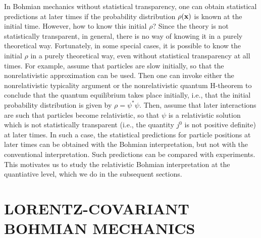 \documentclass[11pt]{article}
\begin{document}
In Bohmian mechanics without statistical transparency, 
one can obtain statistical predictions at later times if 
the probability distribution $\rho({\bf x})$ is known at the initial 
time. However, how to know this initial $\rho$? Since the theory is not
statistically transparent, in general, there 
is no way of knowing it in a purely theoretical way. 
Fortunately, in some special cases, 
it is possible to know the initial $\rho$ in a purely theoretical way, 
even without statistical 
transparency at all times. For example,
assume that particles 
are slow initially, so that the nonrelativistic approximation
can be used. Then one can invoke either the nonrelativistic 
typicality argument \cite{durr1,durr2} or the nonrelativistic 
quantum H-theorem \cite{val} to conclude that 
the quantum equilibrium takes place initially, i.e., 
that the initial 
probability distribution is given by $\rho=\psi^*\psi$. 
%
%
Then, assume that later interactions are such that particles 
become relativistic, so that $\psi$ is a relativistic solution  
which is not statistically transparent
(i.e., the quantity $j^0$ is not positive definite) 
at later times. In such a case, 
the statistical predictions for particle positions at later times 
can be obtained with the Bohmian interpretation, but not with 
the conventional interpretation.
Such predictions can be compared with experiments.
This motivates us to study the relativistic Bohmian interpretation 
at the quantiative level, which we do in the subsequent sections.

\section{LORENTZ-COVARIANT BOHMIAN MECHANICS}
\label{secBM}
\end{document}
